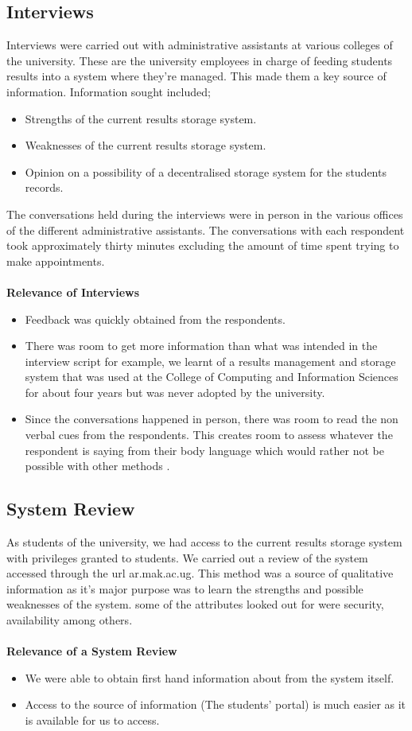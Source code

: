 \subsection{Interviews}
Interviews were carried out with administrative assistants at various colleges of the university. These are the university employees in charge of feeding students results into a system where they're managed. This made them a key source of information. Information sought included;
\begin{itemize}
\item Strengths of the current results storage system.
\item Weaknesses of the current results storage system.
\item Opinion on a possibility of a decentralised storage system for the students records.
\end{itemize}
The conversations held during the interviews were in person in the various offices of the different administrative assistants. The conversations with each respondent took approximately thirty minutes excluding the amount of time spent trying to make appointments.\\~\\
\textbf{Relevance of Interviews}
\begin{itemize}
\item Feedback was quickly obtained from the respondents.
\item There was room to get more information than what was intended in the interview script for example, we learnt of a results management and storage system that was used at the College of Computing and Information Sciences for about four years but was never adopted by the university.
\item Since the conversations happened in person, there was room to read the non verbal cues from the respondents. This creates room to assess whatever the respondent is saying from their body language which would rather not be possible with other methods \cite{17}.
\end{itemize}

\subsection{System Review}
As students of the university, we had access to the current results storage system with privileges granted to students. We carried out a review of the system accessed through the url ar.mak.ac.ug. This method was a source of qualitative information as it's major purpose was to learn the strengths and possible weaknesses of the system. some of the attributes looked out for were security, availability among others.\\~\\
\textbf{Relevance of a System Review}
\begin{itemize}
\item We were able to obtain first hand information about from the system itself.
\item Access to the source of information (The students' portal) is much easier as it is available for us to access.
\end{itemize}


